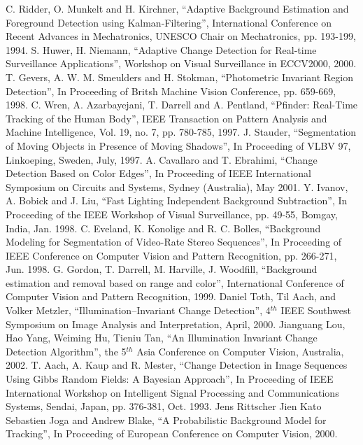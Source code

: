 \begin{thebibliography}{200}
 C. Ridder, O. Munkelt and H. Kirchner, ``Adaptive Background Estimation and Foreground Detection using Kalman-Filtering'', International Conference on Recent Advances in Mechatronics, UNESCO Chair on Mechatronics, pp. 193-199, 1994.
 S. Huwer, H. Niemann, ``Adaptive Change Detection for Real-time Surveillance Applications'', Workshop on Visual Surveillance in ECCV2000, 2000.
 T. Gevers, A. W. M. Smeulders and H. Stokman, ``Photometric Invariant Region Detection'', In Proceeding of Britsh Machine Vision Conference, pp. 659-669, 1998.
 C. Wren, A. Azarbayejani, T. Darrell and A. Pentland, ``Pfinder: Real-Time Tracking of the Human Body”, IEEE Transaction on Pattern Analysis and Machine Intelligence, Vol. 19, no. 7, pp. 780-785, 1997.
 J. Stauder, ``Segmentation of Moving Objects in Presence of Moving Shadows'', In Proceeding of VLBV 97, Linkoeping, Sweden, July, 1997.
 A. Cavallaro and T. Ebrahimi, ``Change Detection Based on Color Edges'', In Proceeding of IEEE International Symposium on Circuits and Systems, Sydney (Australia), May 2001.
 Y. Ivanov, A. Bobick and J. Liu, ``Fast Lighting Independent Background Subtraction'', In Proceeding of the IEEE Workshop of Visual Surveillance, pp. 49-55, Bomgay, India, Jan. 1998.
 C. Eveland, K. Konolige and R. C. Bolles, ``Background Modeling for Segmentation of Video-Rate Stereo Sequences'', In Proceeding of IEEE Conference on Computer Vision and Pattern Recognition, pp. 266-271, Jun. 1998.
 G. Gordon, T. Darrell, M. Harville, J. Woodfill, ``Background estimation and removal based on range and color'', International Conference of Computer Vision and Pattern Recognition, 1999.
 Daniel Toth, Til Aach, and Volker Metzler, ``Illumination--Invariant Change Detection”, 4$^{th}$ IEEE Southwest Symposium on Image Analysis and Interpretation, April, 2000.
 Jianguang Lou, Hao Yang, Weiming Hu, Tieniu Tan, ``An Illumination Invariant Change Detection Algorithm'', the 5$^{th}$ Asia Conference on Computer Vision, Australia, 2002.
 T. Aach, A. Kaup and R. Mester, ``Change Detection in Image Sequences Using Gibbs Random Fields: A Bayesian Approach'', In Proceeding of IEEE International Workshop on Intelligent Signal Processing and Communications Systems, Sendai, Japan, pp. 376-381, Oct. 1993.
 Jens Rittscher Jien Kato Sebastien Joga and Andrew Blake, ``A Probabilistic Background Model for Tracking”, In Proceeding of European Conference on Computer Vision, 2000.

\end{thebibliography}
